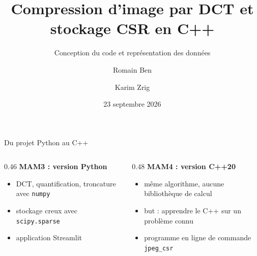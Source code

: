 \documentclass[aspectratio=169,10pt]{beamer}
\title{Compression d'image par DCT et stockage CSR en C++}
\subtitle{Conception du code et représentation des données}
\author{Romain Ben \and Karim Zrig}
\institute{MAM4 Polytech Nice Sophia \quad|\quad Projet C++}
\date{23 septembre 2026}
\newcommand{\speaker}{}
\newcommand{\code}[1]{\texttt{#1}}
\begin{document}
\renewcommand{\speaker}{Romain}

\begin{frame}
  \titlepage
\end{frame}

\begin{frame}{Du projet Python au C++}
  \begin{columns}[T]
    \begin{column}{0.46\textwidth}
      \textbf{MAM3 : version Python}
      \begin{itemize}
        \item DCT, quantification, troncature avec \code{numpy}
        \item stockage creux avec \code{scipy.sparse}
        \item application Streamlit
      \end{itemize}
    \end{column}
    \begin{column}{0.48\textwidth}
      \textbf{MAM4 : version C++20}
      \begin{itemize}
        \item même algorithme, aucune bibliothèque de calcul
        \item but : apprendre le C++ sur un problème connu
        \item programme en ligne de commande \code{jpeg\_csr}
      \end{itemize}
    \end{column}
  \end{columns}

  \vspace{1.4em}
  \centering
\end{frame}
\end{document}
